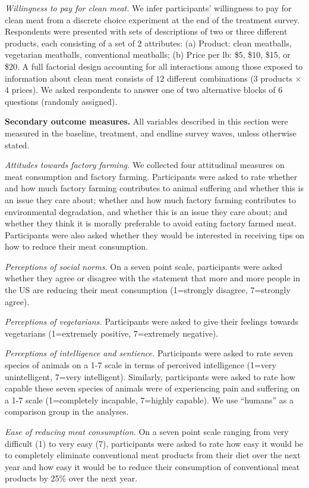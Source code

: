 \documentclass[12pt]{article}
\begin{document}
\textit{Willingness to pay for clean meat.} We infer participants’ willingness to pay for clean meat from a discrete choice experiment at the end of the treatment survey. Respondents were presented with sets of descriptions of two or three different products, each consisting of a set of 2 attributes: (a) Product: clean meatballs, vegetarian meatballs, conventional meatballs; (b) Price per lb: \$5, \$10, \$15, or \$20. A full factorial design accounting for all interactions among those exposed to information about clean meat consists of $12$ different combinations (3 products $\times$ 4 prices). We asked respondents to answer one of two alternative blocks of 6 questions (randomly assigned).

\textbf{Secondary outcome measures.} All variables described in this section were measured in the baseline, treatment, and endline survey waves, unless otherwise stated.

\textit{Attitudes towards factory farming.} We collected four attitudinal measures on meat consumption and factory farming. Participants were asked to rate whether and how much factory farming contributes to animal suffering and whether this is an issue they care about; whether and how much factory farming contributes to environmental degradation, and whether this is an issue they care about; and whether they think it is morally preferable to avoid eating factory farmed meat. Participants were also asked whether they would be interested in receiving tips on how to reduce their meat consumption.

\textit{Perceptions of social norms.} On a seven point scale, participants were asked whether they agree or disagree with the statement that more and more people in the US are reducing their meat consumption (1=strongly disagree, 7=strongly agree).

\textit{Perceptions of vegetarians.} Participants were asked to give their feelings towards vegetarians (1=extremely positive, 7=extremely negative). 

\textit{Perceptions of intelligence and sentience.} Participants were asked to rate seven species of animals on a 1-7 scale in terms of perceived intelligence (1=very unintelligent, 7=very intelligent). Similarly, participants were asked to rate how capable these seven species of animals were of experiencing pain and suffering on a 1-7 scale (1=completely incapable, 7=highly capable). We use ``humans'' as a comparison group in the analyses.

\textit{Ease of reducing meat consumption.} On a seven point scale ranging from very difficult (1) to very easy (7), participants were asked to rate how easy it would be to completely eliminate conventional meat products from their diet over the next year and how easy it would be to reduce their consumption of conventional meat products by 25\% over the next year.
\end{document}

